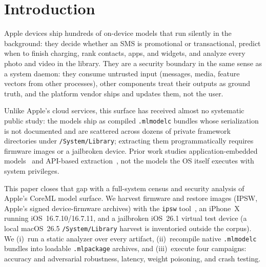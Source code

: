 \documentclass[letterpaper,twocolumn,10pt]{article}
\newcommand{\mlmodelc}{\texttt{.mlmodelc}\xspace}
\newcommand{\mlpackage}{\texttt{.mlpackage}\xspace}
\begin{document}
\begin{abstract}
13.1--52.0~ms (2.3--3.6~ms tokenized, under 0.2~ms legacy-format), with
92.4\% of text-classifier time in the CPU-side NLP core (tokenizer,
embedding, and network), not ANE execution.
(8)~The SMS classifiers label 8--9 of 10 hand-crafted phishing messages
(80--90\%) as Transactional---the model's own output, before any
manipulation; we measure classifier labels, not inbox-placement outcomes.
We filed three reports with Apple Product Security Security: the crash, the internal
build-token leakage, and the internal storage-path disclosure. Apple
reproduced the crash but declined all three as findings that do not cross a
security boundary; we report them, and the weight-integrity and phishing
findings (which we did not file), as robustness results.
\end{abstract}

\section{Introduction}
\label{sec:intro}

Apple devices ship hundreds of on-device models that run silently in the
background: they decide whether an SMS is promotional or transactional,
predict when to finish charging, rank contacts, apps, and widgets, and
analyze every photo and video in the library.
They are a security boundary in the same sense as a system daemon: they
consume untrusted input (messages, media, feature vectors from other
processes), other components treat their outputs as ground truth, and the
platform vendor ships and updates them, not the user.

Unlike Apple's cloud services, this surface has received almost no
systematic public study: the models ship as compiled \mlmodelc{} bundles
whose serialization is not documented and are scattered across dozens of
private framework directories under \texttt{/System/Library}; extracting
them programmatically requires firmware images or a jailbroken device.
Prior work studies application-embedded models~\cite{mobile_audit} and
API-based extraction~\cite{model_extraction}, not the models the OS itself
executes with system privileges.

This paper closes that gap with a full-system census and security analysis
of Apple's CoreML model surface.
We harvest firmware and restore images (IPSW, Apple's signed
device-firmware archives) with the \texttt{ipsw} tool~\cite{ipsw_tool}, an
iPhone~X running iOS~16.7.10/16.7.11, and a jailbroken iOS~26.1 virtual test
device (a local macOS~26.5 \texttt{/System/Library} harvest is inventoried
outside the corpus).
We (i)~run a static analyzer over every artifact, (ii)~recompile native
\mlmodelc{} bundles into loadable \mlpackage{} archives, and (iii)~execute
four campaigns: accuracy and adversarial robustness, latency, weight
poisoning, and crash testing.
\end{document}
